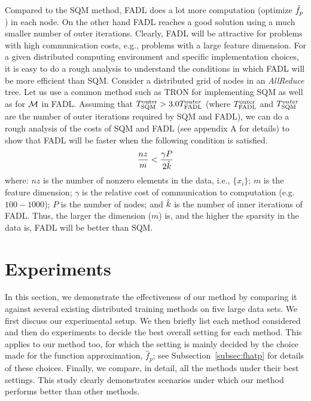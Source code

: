 \documentclass[twoside, 11pt]{article}
\begin{document}
Compared to the SQM method, FADL does a lot more computation (optimize $\fhat_p$) in each node. On the other hand FADL reaches a good solution using a much smaller number of outer iterations. Clearly, FADL will be attractive for problems with high communication costs, e.g., problems with a large feature dimension. For a given distributed computing environment and specific implementation choices, it is easy to do a rough analysis to understand the conditions in which FADL will be more efficient than SQM. Consider a distributed grid of nodes in an {\it AllReduce} tree. Let us use a common method such as TRON for implementing SQM as well as for ${\cal M}$ in FADL. Assuming that $T_{\rm SQM}^{\rm outer}>3.0T_{\rm FADL}^{outer}$ (where $T_{\rm FADL}^{\rm outer}$ and $T_{\rm SQM}^{outer}$ are the number of outer iterations required by SQM and FADL), we can do a rough analysis of the costs of SQM and FADL (see appendix A for details) to show that FADL will be faster when the following condition is satisfied.
\begin{equation}
\frac{nz}{m} < \frac{\gamma P}{2\hat{k}}
\label{comm}
\end{equation}
where: $nz$ is the number of nonzero elements in the data, i.e., $\{x_i\}$; $m$ is the feature dimension; $\gamma$ is the relative cost of communication to computation (e.g. $100-1000$); $P$ is the number of nodes; and $\hat{k}$ is the number of inner iterations of FADL. Thus, the larger the dimension ($m$) is, and the higher the sparsity in the data is, FADL will be better than SQM.




%

\section{Experiments}
\label{expts}

\def\grad{\nabla}
\def\wtilde{\tilde{w}}
\def\Cone{{\cal{C}}^1}
\def\kappap{\kappa^\prime}
\def\Lhat{\hat{L}}
\def\fhat{\hat{f}}
\def\what{\hat{w}}
\def\dhat{\hat{d}}
\def\mysgn{\operatorname{sgn}}





In this section, we demonstrate the effectiveness of our method by comparing it against several existing distributed training methods on five large data sets.
We first discuss our experimental setup. We then briefly list each method considered and then do experiments to decide the best overall setting for each method. This applies to our method too, for which the setting is mainly decided by the choice made for the function approximation, $\fhat_p$; see Subsection~\ref{subsec:fhatp} for details of these choices. Finally, we compare, in detail, all the methods under their best settings. This study clearly demonstrates scenarios under which our method performs better than other methods.
\end{document}
